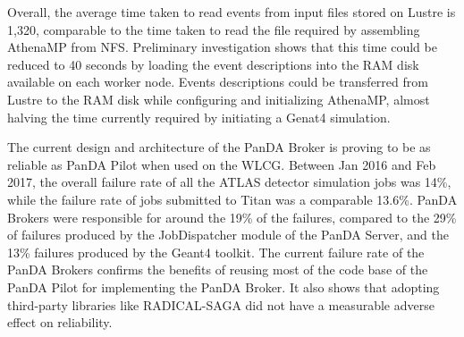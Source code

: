 

Overall, the average time taken to read events from input files stored on Lustre
is 1,320, comparable to the time taken to read the file required by assembling
AthenaMP from NFS. Preliminary investigation shows that this time could be
reduced to 40 seconds by loading the event descriptions into the RAM disk
available on each worker node. Events descriptions could be transferred from
Lustre to the RAM disk while configuring and initializing AthenaMP, almost
halving the time currently required by initiating a Genat4 simulation.

The current design and architecture of the PanDA Broker is proving to be as
reliable as PanDA Pilot when used on the WLCG. Between Jan 2016 and Feb 2017,
the overall failure rate of all the ATLAS detector simulation jobs was 14\%,
while the failure rate of jobs submitted to Titan was a comparable 13.6\%. PanDA
Brokers were responsible for around the 19\% of the failures, compared to the
29\% of failures produced by the JobDispatcher module of the PanDA Server, and
the 13\% failures produced by the Geant4 toolkit. The current failure rate of
the PanDA Brokers confirms the benefits of reusing most of the code base of the
PanDA Pilot for implementing the PanDA Broker. It also shows that adopting
third-party libraries like RADICAL-SAGA did not have a measurable adverse effect
on reliability.
